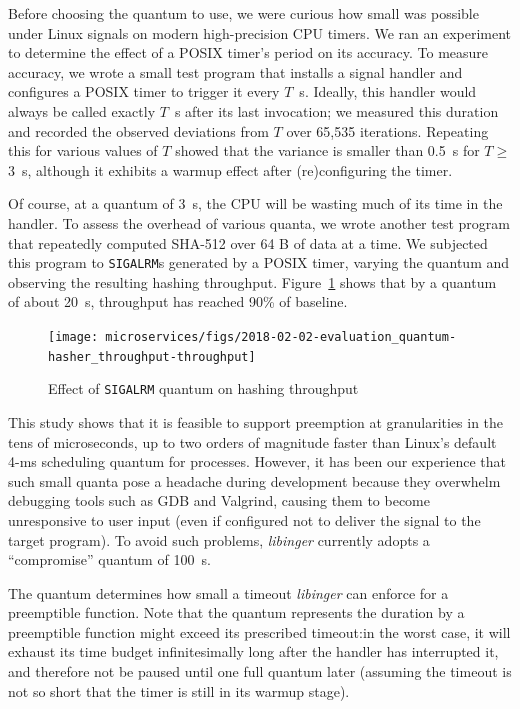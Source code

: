 Before choosing the quantum to use, we were curious how small was possible under
Linux signals on modern high-precision CPU timers.  We ran an experiment to determine
the effect of a POSIX timer's period on its accuracy.  To measure accuracy, we wrote
a small test program that installs a signal handler and configures a POSIX timer to
trigger it every $T$~\textmu{}s.  Ideally, this handler would always be called
exactly $T$~\textmu{}s after its last invocation; we measured this duration and
recorded the observed deviations from $T$ over 65,535 iterations.  Repeating this
for various values of $T$ showed that the variance is smaller than 0.5~\textmu{}s for
$T \ge$ 3~\textmu{}s, although it exhibits a warmup effect after (re)configuring the
timer.

Of course, at a quantum of 3~\textmu{}s, the CPU will be wasting much of its time in
the handler.  To assess the overhead of various quanta, we wrote another test program
that repeatedly computed SHA-512 over 64 B of data at a time.  We subjected this
program to \texttt{SIGALRM}s generated by a POSIX timer, varying the quantum and
observing the resulting hashing throughput.  Figure~\ref{fig:shatput} shows that by a
quantum of about 20~\textmu{}s, throughput has reached 90\% of baseline.

\begin{figure}
\texttt{[image: microservices/figs/2018-02-02-evaluation\_quantum-hasher\_throughput-throughput]}
\caption{Effect of \texttt{SIGALRM} quantum on hashing throughput}
\label{fig:shatput}
\end{figure}

This study shows that it is feasible to support preemption at granularities in the
tens of microseconds, up to two orders of magnitude faster than Linux's default 4-ms
scheduling quantum for processes.  However, it has been our experience that such
small quanta pose a headache during development because they overwhelm debugging
tools such as GDB and Valgrind, causing them to become unresponsive to user input
(even if configured not to deliver the signal to the target program).  To avoid such
problems, \textit{libinger} currently adopts a ``compromise'' quantum of
100~\textmu{}s.

The quantum determines how small a timeout \textit{libinger} can enforce for a
preemptible function.  Note that the quantum represents the duration by a preemptible
function might exceed its prescribed timeout:\@ in the worst case, it will exhaust
its time budget infinitesimally long after the handler has interrupted it, and
therefore not be paused until one full quantum later (assuming the timeout is not so
short that the timer is still in its warmup stage).

